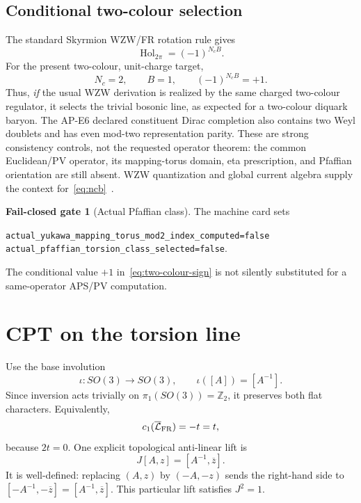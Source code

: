 \documentclass[11pt]{article}
\theoremstyle{definition}
\newtheorem{gate}[theorem]{Fail-closed gate}
\theoremstyle{remark}
\newcommand{\ZZ}{\mathbb Z}
\newcommand{\cL}{\mathcal L}
\newcommand{\Hol}{\operatorname{Hol}}
\begin{document}
\subsection{Conditional two-colour selection}

The standard Skyrmion WZW/FR rotation rule gives
\begin{equation}
 \Hol_{2\pi}=(-1)^{N_cB}.
 \label{eq:ncb}
\end{equation}
For the present two-colour, unit-charge target,
\begin{equation}
 N_c=2,\qquad B=1,\qquad (-1)^{N_cB}=+1.
 \label{eq:two-colour-sign}
\end{equation}
Thus, \emph{if} the usual WZW derivation is realized by the same charged
two-colour regulator, it selects the trivial bosonic line, as expected for a
two-colour diquark baryon.  The AP-E6 declared constituent Dirac completion
also contains two Weyl doublets and has even mod-two representation parity.
These are strong consistency controls, not the requested operator theorem:
the common Euclidean/PV operator, its mapping-torus domain, eta prescription,
and Pfaffian orientation are still absent.  WZW quantization and global
current algebra supply the context for~\eqref{eq:ncb}~\cite{Witten1983APE7}.

\begin{gate}[Actual Pfaffian class]
The machine card sets
\begin{center}
\small
\nolinkurl{actual_yukawa_mapping_torus_mod2_index_computed=false}\\
\nolinkurl{actual_pfaffian_torsion_class_selected=false}.
\end{center}
The conditional value \(+1\) in~\eqref{eq:two-colour-sign} is not silently
substituted for a same-operator APS/PV computation.
\end{gate}

\section{CPT on the torsion line}

Use the base involution
\begin{equation}
 \iota:SO(3)\longrightarrow SO(3),\qquad \iota([A])=[A^{-1}].
 \label{eq:base-involution}
\end{equation}
Since inversion acts trivially on \(\pi_1(SO(3))=\ZZ_2\), it preserves both
flat characters.  Equivalently,
\[
 c_1(\overline{\cL}_{\rm FR})=-t=t,
\]
because \(2t=0\).  One explicit topological anti-linear lift is
\begin{equation}
 J[A,z]=[A^{-1},\overline z].
 \label{eq:real-lift}
\end{equation}
It is well-defined: replacing \((A,z)\) by \((-A,-z)\) sends the right-hand
side to \([-A^{-1},-\overline z]=[A^{-1},\overline z]\).  This particular
lift satisfies \(J^2=1\).
\end{document}
